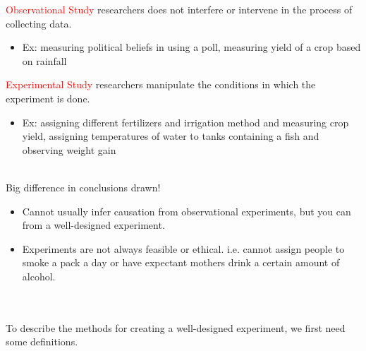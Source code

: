 \documentclass{report}
\begin{document}
\textcolor{red}{Observational Study}
researchers does not interfere or intervene in the process of collecting data. 
\begin{itemize}
\item Ex: measuring political beliefs in using a poll, measuring yield of a crop based on rainfall
\end{itemize}
\textcolor{red}{Experimental Study}
researchers manipulate the conditions in which the experiment is done. 
\begin{itemize}
\item Ex: assigning different fertilizers and irrigation method and measuring crop yield, assigning temperatures of water to tanks containing a fish and observing weight gain
\end{itemize}
~\\
Big difference in conclusions drawn!
\begin{itemize}
\item Cannot usually infer causation from observational experiments, but you can from a well-designed experiment.
\item Experiments are not always feasible or ethical.  i.e. cannot assign people to smoke a pack a day or have expectant mothers drink a certain amount of alcohol.
\end{itemize}
~\\~\\
To describe the methods for creating a well-designed experiment, we first need some definitions.
\end{document}
